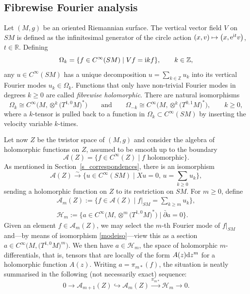 \documentclass[10pt,a4paper]{amsart}
\numberwithin{equation}{section}
\theoremstyle{definition}
\newcommand{\Z}{\mathbb{Z}} %
\newcommand{\R}{\mathbb{R}} %
\newcommand{\1}{{\bf 1}}
\begin{document}
\subsection{Fibrewise Fourier analysis}\label{s_ffa} Let $(M,g)$ be an oriented Riemannian surface. The vertical vector field $V$ on $SM$ is defined as the infinitesimal generator of the circle action $(x,v)\mapsto \bigl(x,{\rm e}^{{\rm i}t}v\bigr)$, $t\in \R$. Defining
\[
	\Omega_k=\{f\in C^\infty(SM)\mid Vf={\rm i}k f\},\qquad k\in \Z,
\]
any $u\in C^\infty(SM)$ has a unique decomposition $u=\sum_{k\in \Z}u_k$ into its vertical Fourier modes $u_k\in \Omega_k$. Functions that only have non-trivial Fourier modes in degrees $k\ge 0$ are called {\it fibrewise holomorphic}.
There are natural isomorphisms
\begin{equation}\label{modeiso}
	\Omega_k \cong C^\infty\bigl(M,\otimes^k \bigl(T^{1,0}M\bigr)^*\bigr)\qquad \text{and} \qquad \Omega_{-k} \cong C^\infty\bigl(M,\otimes^k \bigl(T^{0,1}M\bigr)^*\bigr),\qquad k\ge 0,
\end{equation}
where a $k$-tensor is pulled back to a function in $\Omega_k\subset C^\infty(SM)$ by inserting the velocity variable $k$-times.

Let now $Z$ be the twistor space of $(M,g)$ and consider the algebra of holomorphic functions on $Z$, assumed to be smooth up to the boundary
\[ \mathcal A(Z)=\{f\in C^\infty(Z)\mid f\text{ holomorphic}\}.\]
As mentioned in Section~\ref{s_correspondences}, there is an isomorphism
\begin{equation}\label{def_aoriginal}
\mathcal A(Z)\xrightarrow{\sim} \biggl\{u\in C^\infty(SM) \mid Xu=0,\, u={\sum_{k\ge 0}}u_k\biggr\},
\end{equation}
sending a holomorphic function on $Z$ to its restriction on $SM$. For $m\ge 0$, define
\begin{gather*}%
\mathcal A_m(Z):=\biggl\{f\in \mathcal A(Z)\mid f|_{SM}=\sum_{k\ge m}u_k\biggr\},\\
 \mathcal H_m := \big\{a\in C^\infty\bigl(M,\otimes^m\bigl(T^{1,0}M\bigr)^*\bigr)\mid \bar \partial a=0\big\}.
\end{gather*}
Given an element $f\in \mathcal A_m(Z)$, we may select the $m$-th Fourier mode of $f|_{SM}$ and---by means of isomorphism \eqref{modeiso}---view this as a section $a\in C^\infty\bigl(M,\bigl(T^{1,0}M\bigr)^m\bigr)$. We then have $a\in \mathcal H_m$, the space of holomorphic $m$-differentials, that is, tensors that are locally of the form $A(z) {\rm d}z^m$ for a holomorphic function $A(z)$.
Writing $a=\pi_{m*}(f)$, the situation is neatly summarised in the following (not necessarily exact) sequence:
\[%
	0 \rightarrow \mathcal A_{m+1}(Z) \hookrightarrow \mathcal A_m(Z) \xrightarrow{\pi_{m*}} \mathcal{H}_m\rightarrow 0.
\]
\end{document}
